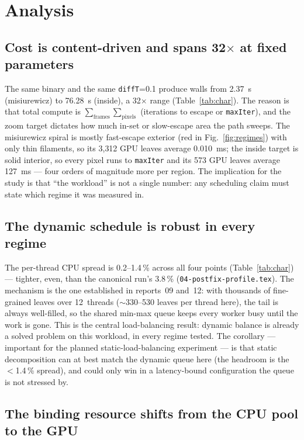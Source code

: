 \documentclass[
	english,
	letterpaper, oneside
]{article}
\begin{document}
\section{Analysis}

\subsection{Cost is content-driven and spans 32$\times$ at fixed parameters}

The same binary and the same \texttt{diffT}=0.1 produce walls from 2.37~s
(misiurewicz) to 76.28~s (inside), a 32$\times$ range (Table~\ref{tab:char}).
The reason is that total compute is $\sum_{\text{frames}}\sum_{\text{pixels}}$
(iterations to escape or \texttt{maxIter}), and the zoom target dictates how much
in-set or slow-escape area the path sweeps. The misiurewicz spiral is mostly
fast-escape exterior (red in Fig.~\ref{fig:regimes}) with only thin filaments, so
its 3{,}312 GPU leaves average 0.010~ms; the inside target is solid interior, so
every pixel runs to \texttt{maxIter} and its 573 GPU leaves average 127~ms ---
four orders of magnitude more per region. The implication for the study is that
``the workload'' is not a single number: any scheduling claim must state which
regime it was measured in.

\subsection{The dynamic schedule is robust in every regime}

The per-thread CPU spread is 0.2--1.4\,\% across all four points
(Table~\ref{tab:char}) --- tighter, even, than the canonical run's 3.8\,\%
(\texttt{04-postfix-profile.tex}). The mechanism is the one established in
reports~09 and~12: with thousands of fine-grained leaves over 12~threads
($\sim$330--530 leaves per thread here), the tail is always well-filled, so the
shared min-max queue keeps every worker busy until the work is gone. This is the
central load-balancing result: dynamic balance is already a solved problem
on this workload, in every regime tested. The corollary --- important for the
planned static-load-balancing experiment --- is that static decomposition can at
best match the dynamic queue here (the headroom is the $<$1.4\,\% spread),
and could only win in a latency-bound configuration the queue is not stressed by.

\subsection{The binding resource shifts from the CPU pool to the GPU}
\end{document}
